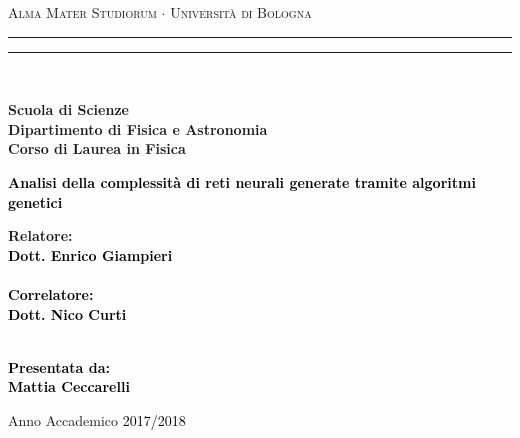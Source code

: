 \documentclass[12pt,a4paper]{report}
\begin{document}
\begin{titlepage}

%
%
%
%
\begin{center}
{{\Large{\textsc{Alma Mater Studiorum $\cdot$ Universit\`a di Bologna}}}} 
\rule[0.1cm]{15.8cm}{0.1mm}
\rule[0.5cm]{15.8cm}{0.6mm}
\\\vspace{3mm}

{\small{\bf Scuola di Scienze \\ 
Dipartimento di Fisica e Astronomia\\
Corso di Laurea in Fisica}}

\end{center}

\vspace{23mm}

\begin{center}\textcolor{black}{
%
%
{\LARGE{\bf Analisi della complessità di reti neurali generate tramite algoritmi genetici}}\\
}\end{center}

\vspace{50mm} \par \noindent

\begin{minipage}[t]{0.47\textwidth}
%
%
{\large{\bf Relatore: \vspace{2mm}\\\textcolor{black}{
Dott. Enrico Giampieri}\\\\
%
%
%
\textcolor{black}{
\bf Correlatore: 
\vspace{2mm}\\
Dott. Nico Curti\\\\}}}
\end{minipage}
%
\hfill
%
\begin{minipage}[t]{0.47\textwidth}\raggedleft \textcolor{black}{
{\large{\bf Presentata da:
\vspace{2mm}\\
%
%
Mattia Ceccarelli}}}
\end{minipage}

\vspace{38mm} %

\begin{center}
%
%
Anno Accademico \textcolor{black}{ 2017/2018}
\end{center}

\end{titlepage}
 
\end{document}
